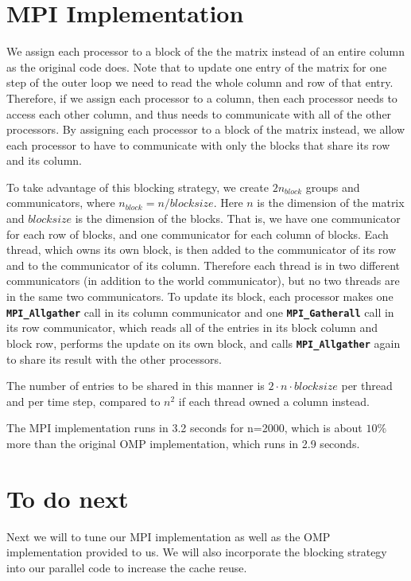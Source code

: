 \documentclass[11pt]{article}
\begin{document}
\section{MPI Implementation}
We assign each processor to a block of the the matrix instead of an entire column as the original code does.
Note that to update one entry of the matrix for one step of the outer loop we need to read the whole column and row of that entry. Therefore, if we assign each processor to a column, then each processor needs to access each other column, and thus needs to communicate with all of the other processors. By assigning each processor to a block of the matrix instead, we allow each processor to have to communicate with only the blocks that share its row and its column.

To take advantage of this blocking strategy, we create $2n_{block}$ groups and communicators, where $n_{block}=n/blocksize$. Here $n$  is the dimension of the matrix and $blocksize$ is the dimension of the blocks. That is, we have one communicator for each row of blocks, and one communicator for each column of blocks. Each thread, which owns its own block, is then added to the communicator of its row and to the communicator of its column. Therefore each thread is in two different communicators (in addition to the world communicator), but no two threads are in the same two communicators. To update its block, each processor makes one \textbf{\texttt{MPI\_Allgather}} call in its column communicator and one \textbf{ \texttt{MPI\_Gatherall} } call in its row communicator, which reads all of the entries in its block column and block row, performs the update on its own block, and calls \textbf{\texttt{MPI\_Allgather}} again to share its result with the other processors.

The number of entries to be shared in this manner is $2 \cdot n \cdot blocksize$ per thread and per time step, compared to $n^2$ if each thread owned a column instead.

The MPI implementation runs in 3.2 seconds for n=2000, which is about $10 \%$ more than the original OMP implementation, which runs in 2.9 seconds.



\section{To do next}
Next we will to tune our MPI implementation as well as the OMP implementation provided to us. We will also incorporate the blocking strategy into our parallel code to increase the cache reuse.
\end{document}
